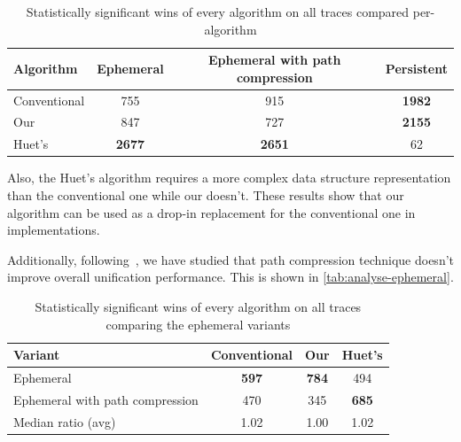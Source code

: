 \begin{table}[b]
    \centering
    \begin{tabular}{l||c|c|c}
        \toprule
        \textbf{Algorithm} & \textbf{Ephemeral} & \textbf{Ephemeral with path compression} & \textbf{Persistent} \\
        \midrule
        Conventional & 755 & 915 & \textbf{1982} \\
        Our & 847 & 727 & \textbf{2155} \\
        Huet's & \textbf{2677} & \textbf{2651} & 62 \\
        \bottomrule
    \end{tabular}
    \caption{Statistically significant wins of every algorithm on all traces compared per-algorithm}
    \label{tab:analyse}
\end{table}

Also, the Huet's algorithm requires a more complex data structure representation than the conventional one while our doesn't.
These results show that our algorithm can be used as a drop-in replacement for the conventional one in \miniKanren implementations.

Additionally, following~\cite{domoratskiy2025empirical}, we have studied that path compression technique doesn't improve overall unification performance. This is shown in \autoref{tab:analyse-ephemeral}.

\begin{table}[b]
    \centering
    \begin{tabular}{l||c|c|c}
        \toprule
        \textbf{Variant} & \textbf{Conventional} & \textbf{Our} & \textbf{Huet's} \\
        \midrule
        Ephemeral & \textbf{597} & \textbf{784} & 494 \\
        Ephemeral with path compression & 470 & 345 & \textbf{685} \\
        \midrule
        Median ratio (avg) & 1.02 & 1.00 & 1.02 \\
        \bottomrule
    \end{tabular}
    \caption{Statistically significant wins of every algorithm on all traces comparing the ephemeral variants}
    \label{tab:analyse-ephemeral}
\end{table}

